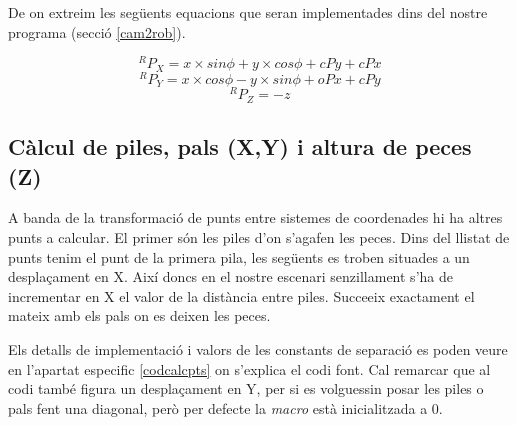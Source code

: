 De on extreim les següents equacions que seran implementades dins del
nostre programa (secció \ref{cam2rob}).

$$^RP_X = x\times sin \phi + y \times cos \phi + cPy + cPx$$
$$^RP_Y = x\times cos \phi - y \times sin \phi + oPx + cPy$$
$$^RP_Z = -z$$

\subsection{Càlcul de piles, pals (X,Y) i altura de peces (Z)} \label{calcpts}
A banda de la transformació de punts entre sistemes de coordenades hi ha altres
punts a calcular.
El primer són les piles d'on s'agafen les peces. Dins del llistat de punts
tenim el punt de la primera pila, les següents es troben situades a un
desplaçament en X. Així doncs en el nostre escenari senzillament s'ha de
incrementar en X el valor de la distància entre piles. Succeeix exactament
el mateix amb els pals on es deixen les peces.

Els detalls de implementació i valors de les constants de separació es poden
veure en l'apartat especific \ref{codcalcpts} on s'explica el codi font. Cal
remarcar que al codi també figura un desplaçament en Y, per si es volguessin
posar les piles o pals fent una diagonal, però per defecte la \emph{macro}
està inicialitzada a 0.




